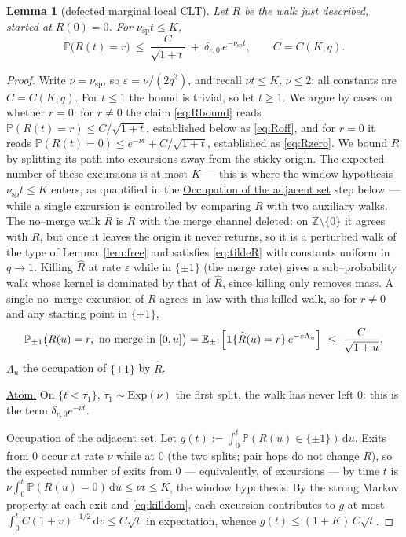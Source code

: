 \documentclass[11pt]{article}
\theoremstyle{plain}
\newtheorem{lemma}[theorem]{Lemma}
\theoremstyle{definition}
\theoremstyle{remark}
\newcommand{\Z}{\mathbb{Z}}\newcommand{\R}{\mathbb{R}}\newcommand{\N}{\mathbb{N}}
\newcommand{\E}{\mathbb{E}}\newcommand{\PP}{\mathbb{P}}\newcommand{\dd}{\,\mathrm{d}}
\newcommand{\eps}{\varepsilon}\newcommand{\Exp}{\mathrm{Exp}}
\begin{document}
\begin{lemma}[defected marginal local CLT]\label{lem:Rlclt}
Let $R$ be the walk just described, started at $R(0)=0$. For $\nu_{\mathrm{sp}}t\le K$,
\begin{equation}\label{eq:Rbound}
  \PP\big(R(t)=r\big)\ \le\ \frac{C}{\sqrt{1+t}}\ +\ \delta_{r,0}\,e^{-\nu_{\mathrm{sp}}t},
  \qquad C=C(K,q).
\end{equation}
\end{lemma}
\begin{proof}
Write $\nu=\nu_{\mathrm{sp}}$, so $\eps=\nu/(2q^2)$, and recall $\nu t\le K$,
$\nu\le2$; all constants are $C=C(K,q)$. For $t\le1$ the bound is trivial, so let
$t\ge1$. We argue by cases on whether $r=0$: for $r\ne0$ the claim \eqref{eq:Rbound}
reads $\PP(R(t)=r)\le C/\sqrt{1+t}$, established below as \eqref{eq:Roff}, and for
$r=0$ it reads $\PP(R(t)=0)\le e^{-\nu t}+C/\sqrt{1+t}$, established as
\eqref{eq:Rzero}. We bound $R$ by splitting its path into excursions away from the sticky origin. The
expected number of these excursions is at most $K$ --- this is where the window
hypothesis $\nu_{\mathrm{sp}}t\le K$ enters, as quantified in the \underline{Occupation
of the adjacent set} step below --- while a single excursion is controlled by comparing
$R$ with two auxiliary walks. The \underline{no--merge}
walk $\widehat R$ is $R$ with the merge channel deleted: on $\Z\setminus\{0\}$ it agrees
with $R$, but once it leaves the origin it never returns, so it is a perturbed walk of
the type of Lemma~\ref{lem:free} and satisfies \eqref{eq:tildeR} with constants uniform
in $q\to1$. Killing $\widehat R$ at rate $\eps$ while in $\{\pm1\}$ (the merge rate)
gives a sub--probability walk whose kernel is dominated by that of $\widehat R$, since
killing only removes mass. A single no--merge excursion of $R$ agrees in law with this
killed walk, so for $r\ne0$ and any starting point in $\{\pm1\}$,
\begin{equation}\label{eq:killdom}
  \PP_{\pm1}\big(R(u)=r,\ \text{no merge in }[0,u]\big)
  =\E_{\pm1}\Big[\bone\{\widehat R(u)=r\}\,e^{-\eps\Lambda_u}\Big]
  \ \le\ \frac{C}{\sqrt{1+u}},
\end{equation}
$\Lambda_u$ the occupation of $\{\pm1\}$ by $\widehat R$.

\underline{Atom.} On $\{t<\tau_1\}$, $\tau_1\sim\Exp(\nu)$ the first split, the walk has
never left $0$: this is the term $\delta_{r,0}e^{-\nu t}$.

\underline{Occupation of the adjacent set.} Let
$g(t):=\int_0^t\PP(R(u)\in\{\pm1\})\dd u$. Exits from $0$ occur at rate $\nu$ while at
$0$ (the two splits; pair hops do not change $R$), so the expected number of exits from
$0$ --- equivalently, of excursions --- by time $t$ is
$\nu\int_0^t\PP(R(u)=0)\dd u\le\nu t\le K$, the window hypothesis. By the strong Markov property
at each exit and \eqref{eq:killdom}, each excursion contributes to $g$ at most
$\int_0^tC(1+v)^{-1/2}\dd v\le C\sqrt t$ in expectation, whence
$g(t)\le(1+K)\,C\sqrt t$.


\end{proof}
\end{document}
